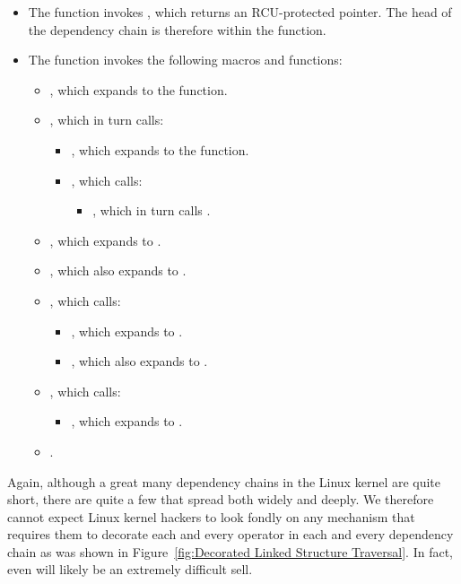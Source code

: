 \documentclass[letterpaper,twocolumn,10pt]{article}
\begin{document}
\begin{itemize}
\item	The  function invokes ,
	which returns an RCU-protected pointer.
	The head of the dependency chain is therefore within
	the  function.
\item	The  function invokes the following macros
	and functions:
	\begin{itemize}
	\item	{}, which expands to
		the  function.
	\item	{}, which in turn calls:
		\begin{itemize}
		\item	{}, which expands to the
			 function.
		\item	{}, which calls:
			\begin{itemize}
			\item	{}, which in turn calls
				.
			\end{itemize}
		\end{itemize}
	\item	{}, which expands to
		.
	\item	{}, which also expands to
		.
	\item	{}, which calls:
		\begin{itemize}
		\item	{}, which expands to
			.
		\item	{}, which also expands to
			.
		\end{itemize}
	\item	{}, which calls:
		\begin{itemize}
		\item	{}, which expands to
			.
		\end{itemize}
	\item	{}.
	\end{itemize}
\end{itemize}

Again, although a great many dependency chains in the Linux kernel
are quite short, there are quite a few that spread both widely and deeply.
We therefore cannot expect Linux kernel hackers to look fondly on
any mechanism that requires them to decorate each and every operator
in each and every dependency chain as was shown in
Figure~\ref{fig:Decorated Linked Structure Traversal}.
In fact, even  will likely be
an extremely difficult sell.
\end{document}
